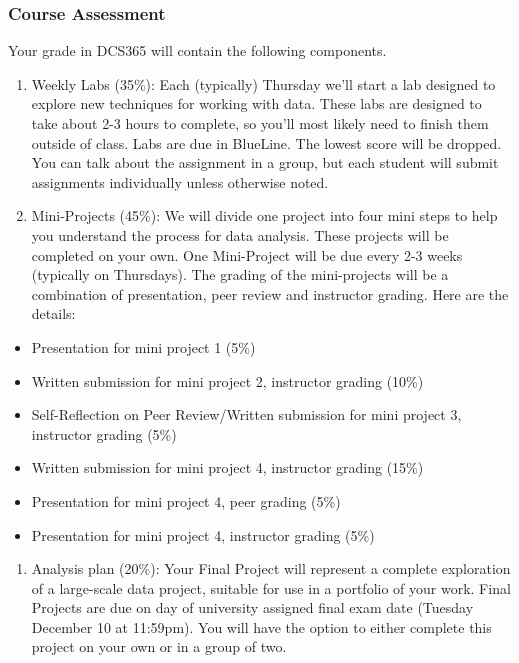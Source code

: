 \documentclass[
  11pt,
  letterpaper,
  DIV=11,
  numbers=noendperiod]{scrartcl}
\providecommand{\tightlist}{%
  \setlength{\itemsep}{0pt}\setlength{\parskip}{0pt}}\usepackage{longtable,booktabs,array}
\begin{document}
\subsubsection{Course Assessment}\label{course-assessment}

Your grade in DCS365 will contain the following components.

\begin{enumerate}
\def\labelenumi{\arabic{enumi}.}
\item
  Weekly Labs (35\%): Each (typically) Thursday we'll start a lab
  designed to explore new techniques for working with data. These labs
  are designed to take about 2-3 hours to complete, so you'll most
  likely need to finish them outside of class. Labs are due in BlueLine.
  The lowest score will be dropped. You can talk about the assignment in
  a group, but each student will submit assignments individually unless
  otherwise noted.
\item
  Mini-Projects (45\%): We will divide one project into four mini steps
  to help you understand the process for data analysis. These projects
  will be completed on your own. One Mini-Project will be due every 2-3
  weeks (typically on Thursdays). The grading of the mini-projects will
  be a combination of presentation, peer review and instructor grading.
  Here are the details:
\end{enumerate}

\begin{itemize}
\tightlist
\item
  Presentation for mini project 1 (5\%)
\item
  Written submission for mini project 2, instructor grading (10\%)
\item
  Self-Reflection on Peer Review/Written submission for mini project 3,
  instructor grading (5\%)
\item
  Written submission for mini project 4, instructor grading (15\%)
\item
  Presentation for mini project 4, peer grading (5\%)
\item
  Presentation for mini project 4, instructor grading (5\%)
\end{itemize}

\begin{enumerate}
\def\labelenumi{\arabic{enumi}.}
\setcounter{enumi}{2}
\tightlist
\item
  Analysis plan (20\%): Your Final Project will represent a complete
  exploration of a large-scale data project, suitable for use in a
  portfolio of your work. Final Projects are due on day of university
  assigned final exam date (Tuesday December 10 at 11:59pm). You will
  have the option to either complete this project on your own or in a
  group of two.
\end{enumerate}
\end{document}
